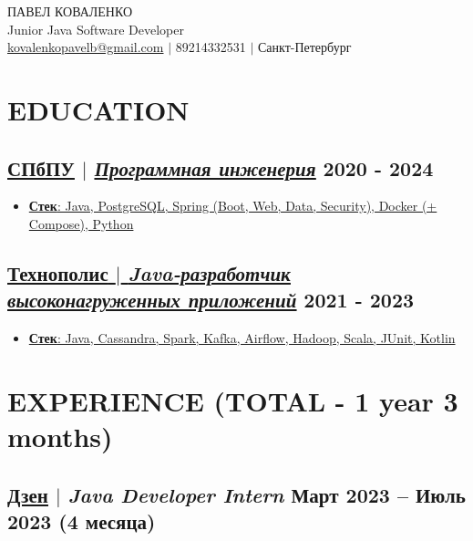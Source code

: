 \documentclass[11pt]{article}
\begin{document}
\begin{center}
    {\fontsize{36}{36}\selectfont ПАВЕЛ КОВАЛЕНКО} \\ \bigskip
    {\fontsize{25}{25}\selectfont Junior Java Software Developer} \\ \bigskip
    {\color{icnclr}\faEnvelope[email]} \href{mailto:kovalenkopavelb@gmail.com}{kovalenkopavelb@gmail.com} $|$ 
    {\color{icnclr}} 89214332531 $|$
    {\color{icnclr}\faMapMarker} Санкт-Петербург
\end{center}

\section{EDUCATION}
\subsection{\href{https://www.spbstu.ru/}{\underline{СПбПУ}} $|$ {\normalfont\textit{\href{https://www.spbstu.ru/structure/graduate_school_software_engineering/}{\underline{Программная инженерия}}}} \hfill 2020 - 2024}
\begin{itemize}
    \item \underline{\textbf{Стек}: Java, PostgreSQL, Spring (Boot, Web, Data, Security), Docker (+ Compose), Python}
\end{itemize}

\subsection{\href{https://polis.vk.company/}{\underline{Технополис} $|$ {\normalfont\textit{\underline{Java-разработчик высоконагруженных приложений}}}} \hfill 2021 - 2023}
\begin{itemize}
    \item \underline{\textbf{Стек}: Java, Cassandra, Spark, Kafka, Airflow, Hadoop, Scala, JUnit, Kotlin}
\end{itemize}

\section{EXPERIENCE (TOTAL - 1 year 3 months)}
\subsection{\href{https://dzen.ru}{\underline{Дзен}} $|$ {\normalfont\textit{Java Developer Intern}} \hfill Март 2023 -- Июль 2023 (4 месяца)}
\end{document}
